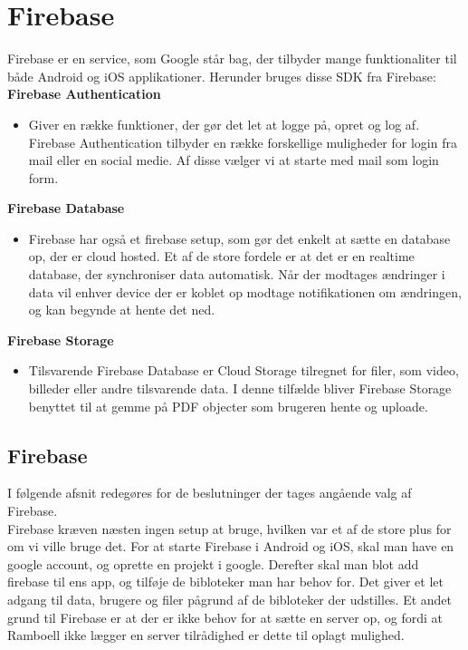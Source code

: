 \section{Firebase}
Firebase\cite{FirebaseDoc} er en service, som Google står bag, der tilbyder mange funktionaliter til både Android og iOS applikationer. Herunder bruges disse SDK fra Firebase: \\

\textbf{Firebase Authentication}
\begin{itemize}[-]
	\itemsep 0.3em 
	\item[] Giver en række funktioner, der gør det let at logge på, opret og log af. Firebase Authentication tilbyder en række forskellige muligheder for login fra mail eller en social medie. Af disse vælger vi at starte med mail som login form. 
\end{itemize}	
\textbf{Firebase Database}
\begin{itemize}[-]
	\itemsep 0.3em 
	\item[]  Firebase har også et firebase setup, som gør det enkelt at sætte en database op, der er cloud hosted. Et af de store fordele er at det er en realtime database, der synchroniser data automatisk. Når der modtages ændringer i data vil enhver device der er koblet op modtage notifikationen om ændringen, og kan begynde at hente det ned. 
\end{itemize}
\textbf{Firebase Storage}
\begin{itemize}[-]
	\itemsep 0.3em 
	\item[] Tilsvarende Firebase Database er Cloud Storage tilregnet for filer, som video, billeder eller andre tilsvarende data. I denne tilfælde bliver Firebase Storage benyttet til at gemme på PDF objecter som brugeren hente og uploade. 
\end{itemize}

\subsection{Firebase}
I følgende afsnit redegøres for de beslutninger der tages angående valg af Firebase. \\
Firebase kræven næsten ingen setup at bruge, hvilken var et af de store plus for om vi ville bruge det. 
For at starte Firebase i Android og iOS, skal man have en google account, og oprette en projekt i google. Derefter skal man blot add firebase til ens app, og tilføje de bibloteker man har behov for.
Det giver et let adgang til data, brugere og filer pågrund af de bibloteker der udstilles. 
Et andet grund til Firebase er at der er ikke behov for at sætte en server op, og fordi at Ramboell ikke lægger en server tilrådighed er dette til oplagt mulighed.

